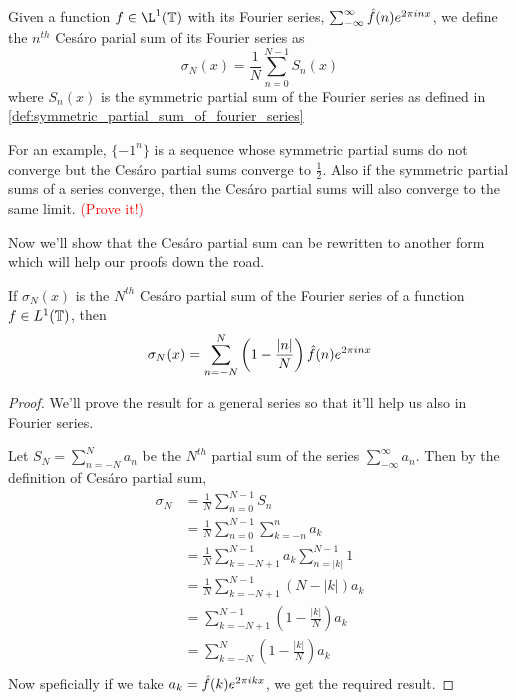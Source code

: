   \begin{definition}
    \label{def:cesaro_partial_sum_of_fourier_series}
    Given a function $f \in \L^1(\T)$ with its Fourier series, $\sum_{-\infty}^\infty \hat{f}(n)e^{2\pi in x}$, we define the $n^{th}$ Ces\'aro parial sum of its Fourier series as
    \begin{displaymath}
      \sigma_N(x) = \frac{1}{N}\sum_{n=0}^{N-1} S_n(x)
    \end{displaymath}
    where $S_n(x)$ is the symmetric partial sum of the Fourier series as defined in \ref{def:symmetric_partial_sum_of_fourier_series}
  \end{definition}
  For an example, $\{-1^{n}\}$ is a sequence whose symmetric partial sums do not converge but the Ces\'aro partial sums converge to $\frac{1}{2}$. Also if the symmetric partial sums of a series converge, then the Ces\'aro partial sums will also converge to the same limit. \textcolor{red}{(Prove it!)}

  Now we'll show that the Ces\'aro partial sum can be rewritten to another form which will help our proofs down the road.
  \begin{lemma}
    \label{lem:property_of_cesaro_partial_sum}
    If $\sigma_N(x)$ is the $N^{th}$ Ces\'aro partial sum of the Fourier series of a function $f\in L^1(\mathbb T)$, then
    \begin{displaymath}
      \sigma_N(x) = \sum_{n=-N}^N \left(1-\frac{\lvert n\rvert}{N} \right) \hat{f}(n) e^{2\pi inx}
    \end{displaymath}
  \end{lemma}
  \begin{proof}
    We'll prove the result for a general series so that it'll help us also in Fourier series.

    Let $S_N = \sum_{n=-N}^{N}a_n$ be the $N^{th}$ partial sum of the series $\sum_{-\infty}^{\infty}a_n$. Then by the definition of Ces\'aro partial sum, 
    \begin{align*}
      \sigma_N  &= \frac{1}{N} \sum_{n=0}^{N-1}S_n \\
                &= \frac{1}{N} \sum_{n=0}^{N-1}\sum_{k=-n}^{n}a_k \\
                &= \frac{1}{N} \sum_{k=-N+1}^{N-1} a_k \sum_{n=|k|}^{N-1} 1 \\
                &= \frac{1}{N} \sum_{k=-N+1}^{N-1} \left(N - |k|\right) a_k \\
                &=  \sum_{k=-N+1}^{N-1} \left(1 - \frac{|k|}{N}\right) a_k \\
                &=  \sum_{k=-N}^{N} \left(1 - \frac{|k|}{N}\right) a_k \\ 
    \end{align*}
    Now speficially if we take $a_k = \hat{f}(k)e^{2\pi ikx}$, we get the required result. 
  \end{proof}

